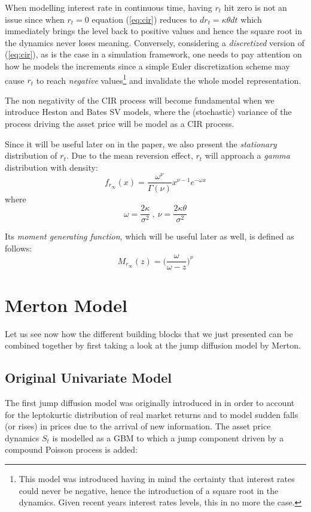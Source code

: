 When modelling interest rate in continuous time, having $r_t$ hit zero is not an issue since when $r_t=0$ equation (\ref{eq:cir}) reduces to $dr_t = \kappa\theta dt$ which immediately brings the level back to positive values and hence the square root in the dynamics never loses meaning. Conversely, considering a \textit{discretized} version of (\ref{eq:cir}), as is the case in a simulation framework, one needs to pay attention on how he models the increments since a simple Euler discretization scheme may cause $r_t$ to reach \textit{negative} values\footnote{This model was introduced having in mind the certainty that interest rates could never be negative, hence the introduction of a square root in the dynamics. Given recent years interest rates levels, this in no more the case.} and invalidate the whole model representation.

The non negativity of the CIR process will become fundamental when we introduce Heston and Bates SV models, where the (stochastic) variance of the process driving the asset price will be model as a CIR process.

Since it will be useful later on in the paper, we also present the \textit{stationary} distribution of $r_t$. Due to the mean reversion effect, $r_t$ will approach a \textit{gamma} distribution with density:
\begin{equation}
\label{eq:cir_pdf}
f_{r_\infty}(x) = \frac{\omega^\nu}{\Gamma(\nu)} x^{\nu-1}e^{-\omega x}
\end{equation}
where
\begin{equation*}
\omega= \frac{2\kappa}{\sigma^2}\: , \: \nu= \frac{2\kappa\theta}{\sigma^2}
\end{equation*}

Its \textit{moment generating function}, which will be useful later as well, is defined as follows:
\begin{equation}
\label{eq:cir_mgf}
	M_{r_\infty}(z) = \Big(\frac{\omega}{\omega-z}\Big)^\nu
\end{equation}

\bigskip
\section{Merton Model}
Let us see now how the different building blocks that we just presented can be combined together by first taking a look at the jump diffusion model by Merton.

\subsection{Original Univariate Model}
The first jump diffusion model was originally introduced in \cite{MERTON1976} in order to account for the leptokurtic distribution of real market returns and to model sudden falls (or rises) in prices due to the arrival of new information.
The asset price dynamics $S_t$ is modelled as a GBM to which a jump component driven by a compound Poisson process is added:

